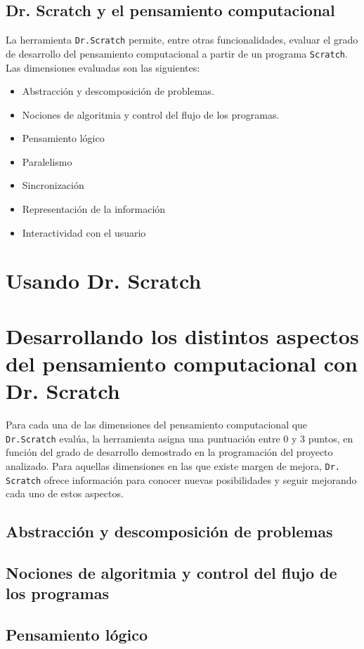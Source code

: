 \documentclass[a4paper,10pt]{article}
\begin{document}
\subsection*{Dr. Scratch y el pensamiento computacional}
La herramienta \texttt{Dr.Scratch} permite, entre otras funcionalidades, evaluar el grado de desarrollo del pensamiento computacional a partir de un programa \texttt{Scratch}. Las dimensiones evaluadas son las siguientes:
\begin{itemize}
 \item Abstracción y descomposición de problemas.
 \item Nociones de algoritmia y control del flujo de los programas.
 \item Pensamiento lógico
 \item Paralelismo
 \item Sincronización
 \item Representación de la información
 \item Interactividad con el usuario
\end{itemize}

\section{Usando Dr. Scratch}

\section{Desarrollando los distintos aspectos del pensamiento computacional con Dr. Scratch}
Para cada una de las dimensiones del pensamiento computacional que \texttt{Dr.Scratch} evalúa, la herramienta asigna una puntuación entre 0 y 3 puntos, en función del grado de desarrollo demostrado en la programación del proyecto analizado. Para aquellas dimensiones en las que existe margen de mejora, \texttt{Dr. Scratch} ofrece información para conocer nuevas posibilidades y seguir mejorando cada uno de estos aspectos.
\subsection{Abstracción y descomposición de problemas}
\subsection{Nociones de algoritmia y control del flujo de los programas}
\subsection{Pensamiento lógico}
\end{document}
